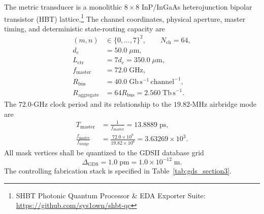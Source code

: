 \documentclass[10pt,twocolumn]{IEEEtran}
\begin{document}
The metric transducer is a monolithic $8\times8$ InP/InGaAs heterojunction bipolar transistor (HBT) lattice.\footnote{SHBT Photonic Quantum Processor \& EDA Exporter Suite: \url{https://github.com/sys1own/shbt-qc}} The channel coordinates, physical aperture, master timing, and deterministic state-routing capacity are
\begin{equation}
\begin{aligned}
(m,n)&\in\{0,\ldots,7\}^2,\qquad N_{\mathrm{ch}}=64, \\
d_e&=50.0\;\mu\mathrm{m}, \\
L_{\mathrm{ctr}}&=7d_e=350.0\;\mu\mathrm{m}, \\
f_{\mathrm{master}}&=72.0\;\mathrm{GHz}, \\
R_{\mathrm{bus}}&=40.0\;\mathrm{Gb\,s^{-1}\,channel^{-1}}, \\
R_{\mathrm{aggregate}}&=64R_{\mathrm{bus}}
=2.560\;\mathrm{Tb\,s^{-1}}.
\end{aligned}
\label{eq:hbt_array_architecture}
\end{equation}
The $72.0$-GHz clock period and its relationship to the $19.82$-MHz airbridge mode are
\begin{equation}
\begin{aligned}
T_{\mathrm{master}}&=\frac{1}{f_{\mathrm{master}}}
=13.8889\;\mathrm{ps}, \\
\frac{f_{\mathrm{master}}}{f_{\mathrm{bridge}}}
&=\frac{72.0\times10^9}{19.82\times10^6}
=3.63269\times10^3.
\end{aligned}
\label{eq:clock_mode_separation}
\end{equation}
All mask vertices shall be quantized to the GDSII database grid
\begin{equation}
\Delta_{\mathrm{GDS}}=1.0\;\mathrm{pm}=1.0\times10^{-12}\;\mathrm{m}.
\label{eq:gds_grid_section3}
\end{equation}
The controlling fabrication stack is specified in Table~\ref{tab:gds_section3}.
\end{document}
